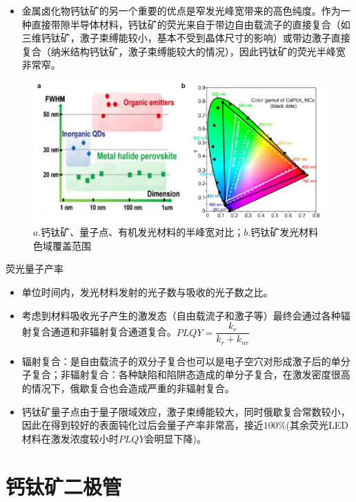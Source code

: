 \documentclass{beamer}[fontset=windows]
\begin{document}
\begin{frame}
	\begin{itemize}
		\item 金属卤化物钙钛矿的另一个重要的优点是窄发光峰宽带来的高色纯度。作为一种直接带隙半导体材料，钙钛矿的荧光来自于带边自由载流子的直接复合（如三维钙钛矿，激子束缚能较小，基本不受到晶体尺寸的影响）或带边激子直接复合（纳米结构钙钛矿，激子束缚能较大的情况），因此钙钛矿的荧光半峰宽非常窄。
	\end{itemize}
	\begin{figure}[H]
	\centering
	\hspace{2em}\includegraphics[width=.7\linewidth]{pic/3.png}
	\caption{$a.$钙钛矿、量子点、有机发光材料的半峰宽对比；$b.$钙钛矿发光材料色域覆盖范围\cite{yakunin2015low}
	}
\end{figure}
\end{frame}
\begin{frame}
	\begin{block}{荧光量子产率}
		\begin{itemize}
			\item 单位时间内，发光材料发射的光子数与吸收的光子数之比。
			\item 考虑到材料吸收光子产生的激发态（自由载流子和激子等）最终会通过各种辐射复合通道和非辐射复合通道复合。$PLQY=\dfrac{k_{r}}{k_{r}+k_{nr}}$
			\item 辐射复合：是自由载流子的双分子复合也可以是电子空穴对形成激子后的单分子复合；非辐射复合：各种缺陷和陷阱态造成的单分子复合，在激发密度很高的情况下，俄歇复合也会造成严重的非辐射复合。
			\item 钙钛矿量子点由于量子限域效应，激子束缚能较大，同时俄歇复合常数较小，因此在得到较好的表面钝化过后会量子产率非常高，接近$100\%$\cite{li2016cspbx3}(其余荧光LED材料在激发浓度较小时$PLQY$会明显下降)。
		\end{itemize}
	\end{block}
\end{frame}
\section{钙钛矿二极管}
\end{document}
